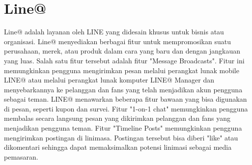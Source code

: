 \section{Line@}
\label{sec:Line@}
Line@ adalah layanan oleh LINE yang didesain khusus untuk bisnis atau organisasi. Line@ menyediakan berbagai fitur untuk mempromosikan suatu perusahaan, merek, atau produk dalam cara yang baru dan dengan jangkauan yang luas. Salah satu fitur tersebut adalah fitur "Message Broadcasts". Fitur ini memungkinkan pengguna mengirimkan pesan melalui perangkat lunak mobile LINE@ atau melalui perangkat lunak komputer LINE@ Manager dan menyebarkannya ke pelanggan dan fans yang telah menjadikan akun pengguna sebagai teman. LINE@ menawarkan beberapa fitur bawaan yang bisa digunakan di pesan, seperti kupon dan survei. Fitur "1-on-1 chat" memungkinkan pengguna membalas secara langsung pesan yang dikirimkan pelanggan dan fans yang menjadikan pengguna teman. Fitur "Timeline Posts" memungkinkan pengguna mengirimkan postingan di linimasa. Postingan tersebut bisa diberi "like" atau dikomentari sehingga dapat memaksimalkan potensi linimasi sebagai media pemasaran.\footnotemark
{}
